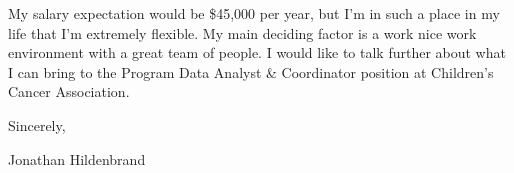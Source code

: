 \documentclass[letterpaper,12pt]{article}[leftmargin=*]
\begin{document}
\vspace{12pt}

\hspace{24pt}My salary expectation would be \$45,000 per year, but I'm in such a place in my life that I'm extremely flexible. My main deciding factor is a work nice work environment with a great team of people. I would like to talk further about what I can bring to the Program Data Analyst \& Coordinator position at Children's Cancer Association.

\vspace{24pt}

Sincerely,

\vspace{12pt}

Jonathan Hildenbrand

\end{document}
